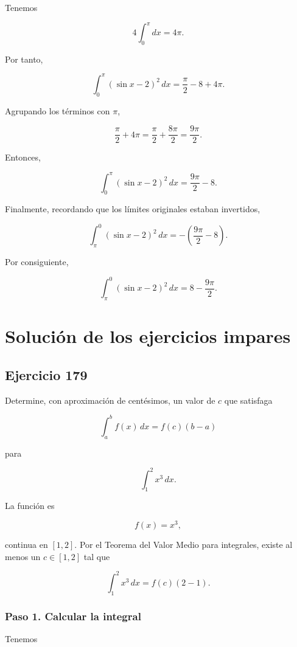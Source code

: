 \documentclass[12pt]{article}
\begin{document}
Tenemos

\[
4\int_0^\pi dx
=
4\pi.
\]

Por tanto,

\[
\int_0^\pi(\sin x-2)^2\,dx
=
\frac{\pi}{2}-8+4\pi.
\]

Agrupando los términos con \(\pi\),

\[
\frac{\pi}{2}+4\pi
=
\frac{\pi}{2}+\frac{8\pi}{2}
=
\frac{9\pi}{2}.
\]

Entonces,

\[
\int_0^\pi(\sin x-2)^2\,dx
=
\frac{9\pi}{2}-8.
\]

Finalmente, recordando que los límites originales estaban invertidos,

\[
\int_\pi^0(\sin x-2)^2\,dx
=
-\left(
\frac{9\pi}{2}-8
\right).
\]

Por consiguiente,

\[
\boxed{
\int_\pi^0(\sin x-2)^2\,dx
=
8-\frac{9\pi}{2}
}.
\]


\section*{Solución de los ejercicios impares}

\subsection*{Ejercicio 179}

Determine, con aproximación de centésimos, un valor de \(c\) que satisfaga

\[
\int_a^b f(x)\,dx=f(c)(b-a)
\]

para

\[
\int_1^2 x^3\,dx.
\]

La función es

\[
f(x)=x^3,
\]

continua en \([1,2]\). Por el Teorema del Valor Medio para integrales,
existe al menos un \(c\in[1,2]\) tal que

\[
\int_1^2 x^3\,dx=f(c)(2-1).
\]

\subsubsection*{Paso 1. Calcular la integral}

Tenemos
\end{document}
